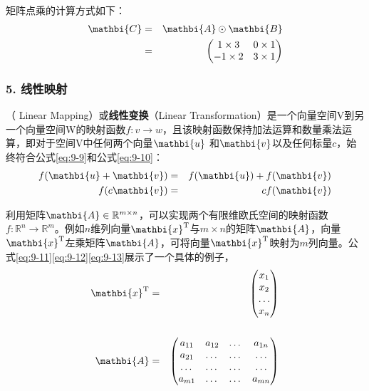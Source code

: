 \parinterval 矩阵点乘的计算方式如下：
\begin{eqnarray}
{\mathbi{C}} & = & {\mathbi{A}}\odot {\mathbi{B}} \nonumber \\
          & = & \begin{pmatrix}
   1\times 3 & 0\times1\\
   -1\times2 & 3\times1
\end{pmatrix}
\label{eq:9-8}
\end{eqnarray}


\subsubsection{5. 线性映射}

（ Linear Mapping）或{\small\sffamily\bfseries{线性变换}}（Linear Transformation）是一个向量空间V到另一个向量空间W的映射函数$ f:v\rightarrow w$，且该映射函数保持加法运算和数量乘法运算，即对于空间V中任何两个向量$ {\mathbi{u}} $ 和$ {\mathbi{v}} $以及任何标量$ c $，始终符合公式\eqref{eq:9-9}和公式\eqref{eq:9-10}：
\begin{eqnarray}
f({\mathbi{u}}+{\mathbi{v}})&=&f({\mathbi{u}})+f({\mathbi{v}})\label{eq:9-9}\\
f(c{\mathbi{v}})&=&cf({\mathbi{v}})
\label{eq:9-10}
\end{eqnarray}

\parinterval 利用矩阵$ {\mathbi{A}}\in {\mathbb R}^{m\times n} $，可以实现两个有限维欧氏空间的映射函数$f:{\mathbb R}^n\rightarrow {\mathbb R}^m$。例如$ n $维列向量$ {\mathbi{x}} ^{\textrm T}$与$ m\times n $的矩阵$ {\mathbi{A}} $，向量$ {\mathbi{x}} ^{\textrm T}$左乘矩阵$ {\mathbi{A}} $，可将向量$ {\mathbi{x}} ^{\textrm T}$映射为$ m $列向量。公式\eqref{eq:9-11}\eqref{eq:9-12}\eqref{eq:9-13}展示了一个具体的例子，
\begin{eqnarray}
{\mathbi{x}}^{\textrm{T}} & = & {\begin{pmatrix} x_1\\ x_2 \\  \dots  \\ x_n \end{pmatrix}}
\label{eq:9-11}\\ \\
{\mathbi{A}}&=&
\begin{pmatrix}
   a_{11} & a_{12} & \dots & a_{1n}\\
   a_{21} & \dots & \dots & \dots \\
   \dots & \dots & \dots & \dots \\
   a_{m1} & \dots & \dots & a_{mn}
\end{pmatrix}
\label{eq:9-12}
\end{eqnarray}


